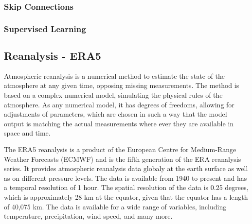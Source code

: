 \subsubsection*{Skip Connections}

\subsubsection*{Supervised Learning}

\subsection{Reanalysis - ERA5}

Atmospheric reanalysis is a numerical method to estimate the state of the atmosphere at any given time, opposing missing measurements. The method is based on a complex numerical model, simulating the physical rules of the atmosphere. As any numerical model, it has degrees of freedoms, allowing for adjustments of parameters, which are chosen in such a way that the model output is matching the actual measurements where ever they are available in space and time.

The ERA5 reanalysis is a product of the European Centre for Medium-Range Weather Forecasts (ECMWF) and is the fifth generation of the ERA reanalysis series. It provides atmospheric reanalysis data globaly at the earth surface as well as on different pressure levels. The data is available from 1940 to present and has a temporal resolution of 1 hour. The spatial resolution of the data is 0.25 degrees, which is approximately 28 km at the equator, given that the equator has a length of 40,075 km. The data is available for a wide range of variables, including temperature, precipitation, wind speed, and many more. 